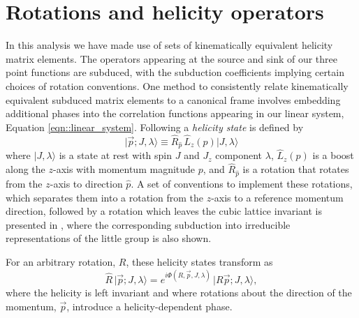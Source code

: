 \documentclass[twocolumn,amsmath,amssymb,prd,10pt,floatfix, 
superscriptaddress,nofootinbib, showpacs, preprintnumbers]{revtex4-1}
\begin{document}
\appendix

%
\section{Rotations and helicity operators\label{app::helOps}}

In this analysis we have made use of sets of kinematically equivalent helicity matrix elements. The operators appearing at the source and sink of our three point functions are subduced, with the subduction coefficients implying certain choices of rotation conventions. One method to consistently relate kinematically equivalent subduced matrix elements to a canonical frame involves embedding additional phases into the correlation functions appearing in our linear system, Equation \ref{eqn::linear_system}. Following \cite{Thomas:2011rh} a \emph{helicity state} is defined by 
\begin{equation}
\big|   \vec{p}; J,\lambda   \big\rangle \equiv \hat{R}_{\hat{p}}\,  \hat{L}_z(p) \big|  J,\lambda  \big\rangle 
\label{hel_defn}
\end{equation}
where $\big|J,\lambda \big\rangle$ is a state at rest with spin $J$ and $J_z$ component $\lambda$, $\hat{L}_z(p)$ is a boost along the $z$-axis with momentum magnitude $p$, and $\hat{R}_{\hat{p}}$ is a rotation that rotates from the $z$-axis to direction $\hat{p}$. A set of conventions to implement these rotations, which separates them into a rotation from the $z$-axis to a reference momentum direction, followed by a rotation which leaves the cubic lattice invariant is presented in \cite{Thomas:2011rh}, where the corresponding subduction into irreducible representations of the little group is also shown. 

For an arbitrary rotation, $R$, these helicity states transform as 
\begin{equation}
\hat{R}\, \big| \vec{p}; J,\lambda \big\rangle = e^{i \Phi(R, \vec{p}, J, \lambda)}\, \big| R \vec{p}; J,\lambda \big\rangle,
\label{hel_phase}
\end{equation}
where the helicity is left invariant and where rotations about the direction of the momentum, $\vec{p}$, introduce a helicity-dependent phase. 
\end{document}
